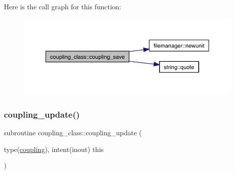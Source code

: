 Here is the call graph for this function\+:\nopagebreak
\begin{figure}[H]
\begin{center}
\leavevmode
\includegraphics[width=350pt]{namespacecoupling__class_af46ffcc2d49425d21e248f173b5377bd_cgraph}
\end{center}
\end{figure}
\mbox{\label{namespacecoupling__class_a034f9e137631afdb03a75cc32bf1956d}} 
\subsubsection{\texorpdfstring{coupling\+\_\+update()}{coupling\_update()}}
{\footnotesize\ttfamily subroutine coupling\+\_\+class\+::coupling\+\_\+update (\begin{DoxyParamCaption}\item[{type(\hyperlink{structcoupling__class_1_1coupling}{coupling}), intent(inout)}]{this }\end{DoxyParamCaption})\hspace{0.3cm}{\ttfamily [private]}}

